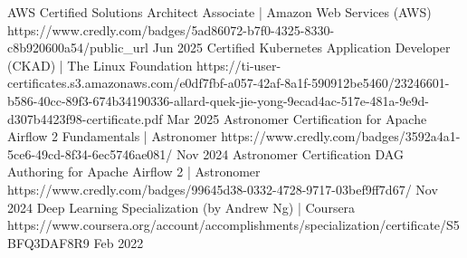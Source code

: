 

\begin{cvhonors}

  \cvhonor
    {AWS Certified Solutions Architect Associate} %
    {| Amazon Web Services (AWS)} %
    {https://www.credly.com/badges/5ad86072-b7f0-4325-8330-c8b920600a54/public_url} %
    {Jun 2025} %
  \cvhonor
    {Certified Kubernetes Application Developer (CKAD)} %
    {| The Linux Foundation} %
    {https://ti-user-certificates.s3.amazonaws.com/e0df7fbf-a057-42af-8a1f-590912be5460/23246601-b586-40cc-89f3-674b34190336-allard-quek-jie-yong-9ecad4ac-517e-481a-9e9d-d307b4423f98-certificate.pdf} %
    {Mar 2025} %
  \cvhonor
    {Astronomer Certification for Apache Airflow 2 Fundamentals} %
    {| Astronomer} %
    {https://www.credly.com/badges/3592a4a1-5ce6-49cd-8f34-6ec5746ae081/} %
    {Nov 2024} %
  \cvhonor
    {Astronomer Certification DAG Authoring for Apache Airflow 2} %
    {| Astronomer} %
    {https://www.credly.com/badges/99645d38-0332-4728-9717-03bef9ff7d67/} %
    {Nov 2024} %
  \cvhonor
    {Deep Learning Specialization (by Andrew Ng)} %
    {| Coursera} %
    {https://www.coursera.org/account/accomplishments/specialization/certificate/S5BFQ3DAF8R9} %
    {Feb 2022} %
\end{cvhonors}
\newpage
